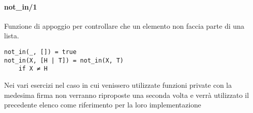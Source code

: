 \documentclass[12pt,twoside]{report}
\begin{document}
\paragraph{not\_in/1}
Funzione di appoggio per controllare che un elemento non faccia parte di una lista.
\begin{lstlisting}
not_in(_, []) = true
not_in(X, [H | T]) = not_in(X, T)
    if X ≠ H
\end{lstlisting}

Nei vari esercizi nel caso in cui venissero utilizzate funzioni private con la medesima firma non verranno riproposte una seconda volta e verrà utilizzato il precedente elenco come riferimento per la loro implementazione
\end{document}
